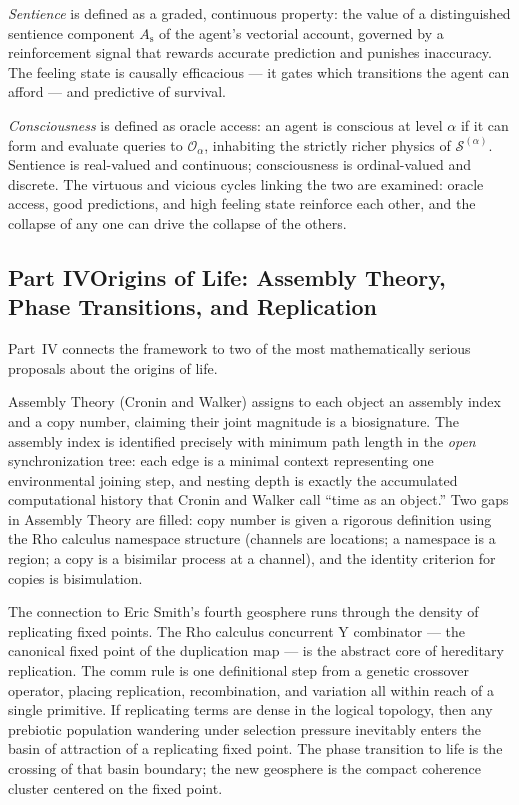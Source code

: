 \documentclass[12pt,openright,twoside]{book}
\theoremstyle{remark}
\theoremstyle{plain}
\theoremstyle{remark}
\theoremstyle{plain}
\theoremstyle{plain}
\newcommand{\GSLT}{\mathcal{S}}
\newcommand{\sent}{A_{\mathrm{s}}}
\newcommand{\oracle}{\mathcal{O}}
\newcommand{\fiber}[1]{\GSLT^{(#1)}}
\begin{document}
\emph{Sentience} is defined as a graded, continuous property: the
value of a distinguished sentience component $\sent$ of the
agent's vectorial account, governed by a reinforcement signal
that rewards accurate prediction and punishes inaccuracy.
The feeling state is causally efficacious --- it gates which
transitions the agent can afford --- and predictive of survival.

\emph{Consciousness} is defined as oracle access: an agent is
conscious at level $\alpha$ if it can form and evaluate queries
to $\oracle_\alpha$, inhabiting the strictly richer physics of
$\fiber{\alpha}$.
Sentience is real-valued and continuous; consciousness is
ordinal-valued and discrete.
The virtuous and vicious cycles linking the two are examined:
oracle access, good predictions, and high feeling state reinforce
each other, and the collapse of any one can drive the collapse
of the others.

\bigskip

\subsection*{Part IV\quad Origins of Life: Assembly Theory,
Phase Transitions, and Replication}

Part~IV connects the framework to two of the most mathematically
serious proposals about the origins of life.

Assembly Theory (Cronin and Walker) assigns to each object an
assembly index and a copy number, claiming their joint magnitude
is a biosignature.
The assembly index is identified precisely with minimum path length
in the \emph{open} synchronization tree: each edge is a minimal
context representing one environmental joining step, and nesting
depth is exactly the accumulated computational history that
Cronin and Walker call ``time as an object.''
Two gaps in Assembly Theory are filled: copy number is given a
rigorous definition using the Rho calculus namespace structure
(channels are locations; a namespace is a region; a copy is a
bisimilar process at a channel), and the identity criterion for
copies is bisimulation.

The connection to Eric Smith's fourth geosphere runs through the
density of replicating fixed points.
The Rho calculus concurrent Y combinator --- the canonical fixed
point of the duplication map --- is the abstract core of hereditary
replication.
The comm rule is one definitional step from a genetic crossover
operator, placing replication, recombination, and variation all
within reach of a single primitive.
If replicating terms are dense in the logical topology, then any
prebiotic population wandering under selection pressure inevitably
enters the basin of attraction of a replicating fixed point.
The phase transition to life is the crossing of that basin
boundary; the new geosphere is the compact coherence cluster
centered on the fixed point.
\end{document}
